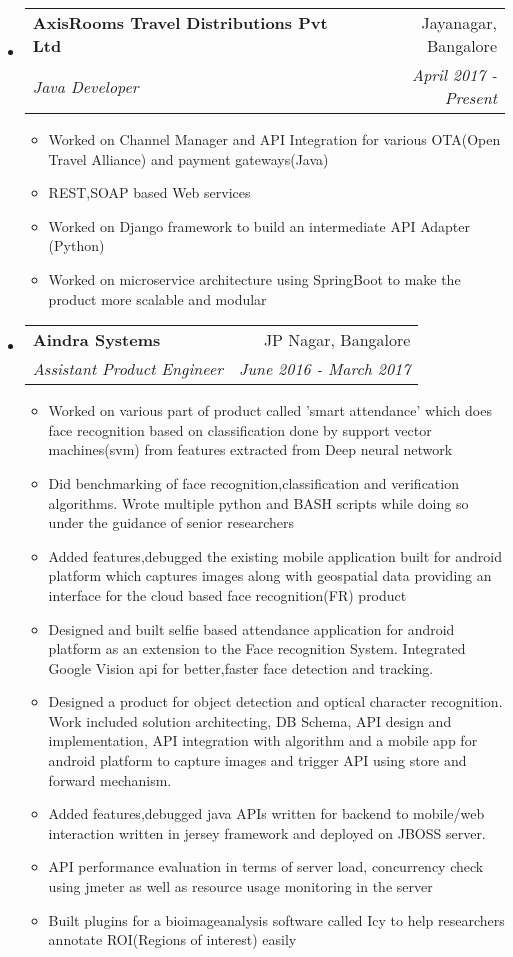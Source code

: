 \documentclass[letterpaper,11pt]{article}
\makeatletter
\newcommand{\resitem}[1]{\item #1 \vspace{-2pt}}
\newcommand{\ressubheading}[4]{
\begin{tabular*}{6.5in}{l@{\extracolsep{\fill}}r}
		\textbf{#1} & #2 \\
		\textit{#3} & \textit{#4} \\
\end{tabular*}\vspace{-6pt}}
\makeatother
\begin{document}
\begin{itemize}
\item
	\ressubheading{AxisRooms Travel  Distributions Pvt Ltd}{Jayanagar, Bangalore}{Java Developer}{April 2017 - Present}
	\begin{itemize}
		\resitem{Worked on Channel Manager and API Integration for various OTA(Open Travel Alliance) and  payment gateways(Java)}
		\resitem{REST,SOAP based Web services}
		\resitem{Worked on Django framework to build an intermediate API Adapter (Python)}
		\resitem{Worked on microservice architecture using SpringBoot to make the product more scalable and modular}
	\end{itemize}

\end{itemize}


\begin{itemize}
\item
	\ressubheading{Aindra Systems}{JP Nagar, Bangalore}{Assistant Product Engineer}{June 2016 - March 2017}
	\begin{itemize}
		\resitem{Worked on various part of product called 'smart attendance' which does face recognition based on classification done by support vector machines(svm) from features extracted from Deep neural network}
		\resitem{Did benchmarking of face recognition,classification and verification algorithms. Wrote multiple python and BASH scripts while doing so under the guidance of senior researchers}
		\resitem{Added features,debugged the existing mobile application built for android platform which captures images along with geospatial data providing an interface for the cloud based face recognition(FR) product}
		\resitem{Designed and built selfie based attendance application for android platform as an extension to the Face recognition System. Integrated Google Vision api for better,faster face detection and tracking.}
		\resitem{Designed a product for object detection and optical character recognition. Work included solution architecting, DB Schema, API design and implementation, API integration with algorithm and a mobile app for android platform to capture images and trigger API using store and forward mechanism.}
		\resitem{Added features,debugged java APIs written for backend to mobile/web interaction written in jersey framework and deployed on JBOSS server.}
		\resitem{API performance evaluation in terms of server load, concurrency check using jmeter as well as resource usage monitoring in the server}
		\resitem{Built plugins for a bioimageanalysis software called Icy to help researchers annotate ROI(Regions of interest) easily}
		\end{itemize}
\end{itemize}
\end{document}
